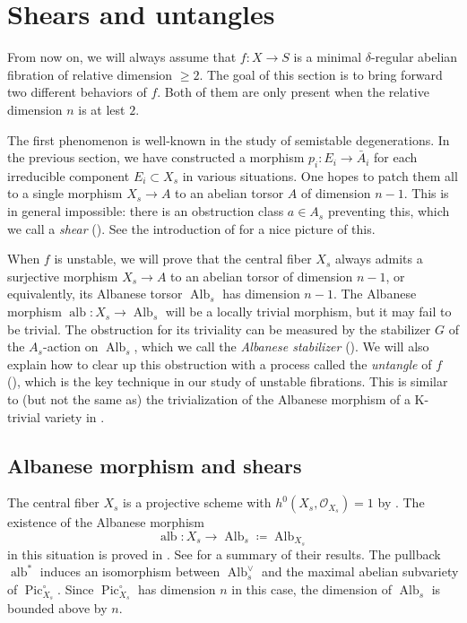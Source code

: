 \documentclass[reqno, letterpaper]{amsart}
\numberwithin{equation}{subsection}
\let\to\longrightarrow
\DeclareMathOperator{\Pic}{Pic}
\DeclareMathOperator{\Alb}{Alb}
\DeclareMathOperator{\alb}{alb}
\begin{document}
		
		
\section{Shears and untangles} \label{sec:shears and untangles}
	From now on, we will always assume that $f : X \to S$ is a minimal $\delta$-regular abelian fibration of relative dimension $\ge 2$. The goal of this section is to bring forward two different behaviors of $f$. Both of them are only present when the relative dimension $n$ is at lest $2$.
	
	\medskip
	
	The first phenomenon is well-known in the study of semistable degenerations. In the previous section, we have constructed a morphism $p_i : E_i \to \bar A_i$ for each irreducible component $E_i \subset X_s$ in various situations. One hopes to patch them all to a single morphism $X_s \to A$ to an abelian torsor $A$ of dimension $n-1$. This is in general impossible: there is an obstruction class $a \in A_s$ preventing this, which we call a \emph{shear} (). See the introduction of \cite{sawon22} for a nice picture of this.
	
	When $f$ is unstable, we will prove that the central fiber $X_s$ always admits a surjective morphism $X_s \to A$ to an abelian torsor of dimension $n-1$, or equivalently, its Albanese torsor $\Alb_s$ has dimension $n-1$. The Albanese morphism $\alb : X_s \to \Alb_s$ will be a locally trivial morphism, but it may fail to be trivial. The obstruction for its triviality can be measured by the stabilizer $G$ of the $A_s$-action on $\Alb_s$, which we call the \emph{Albanese stabilizer} (). We will also explain how to clear up this obstruction with a process called the \emph{untangle} of $f$ (), which is the key technique in our study of unstable fibrations. This is similar to (but not the same as) the trivialization of the Albanese morphism of a K-trivial variety in \cite[Theorem~15]{kaw81}.
	
	
	
	\subsection{Albanese morphism and shears}
		The central fiber $X_s$ is a projective scheme with $h^0(X_s, \mathcal O_{X_s}) = 1$ by . The existence of the Albanese morphism
		\[ \alb : X_s \to \Alb_s \coloneq \Alb_{X_s} \]
		in this situation is proved in \cite{con:albanese, lau-sch24}. See  for a summary of their results. The pullback $\alb^*$ induces an isomorphism between $\Alb_s^\vee$ and the maximal abelian subvariety of $\Pic^\circ_{X_s}$. Since $\Pic^\circ_{X_s}$ has dimension $n$ in this case, the dimension of $\Alb_s$ is bounded above by $n$.
		
\end{document}
